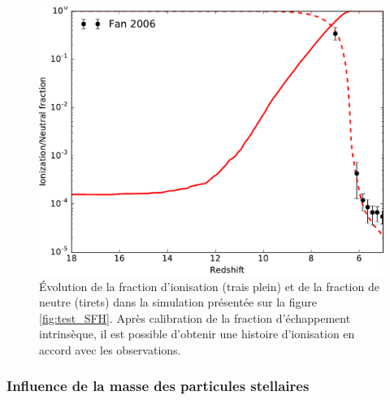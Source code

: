 \begin{figure}
        \includegraphics[width=.95\linewidth]{img/02/xion.pdf} 
        \caption[Histoire d'ionisation]{Évolution de la fraction d'ionisation (trais plein) et de la fraction de neutre (tirets) dans la simulation présentée sur la figure \ref{fig:test_SFH}.
        Après calibration de la fraction d’échappement intrinsèque, il est possible d'obtenir une histoire d'ionisation en accord avec les observations.
 		\label{fig:test_xion}}
\end{figure}

\subsubsection{Influence de la masse des particules stellaires}


